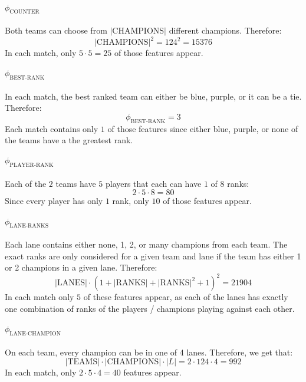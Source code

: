 \paragraph{$\phi_{\text{COUNTER}}$}
\begin{adjustwidth}{2cm}{}
Both teams can choose from $|\text{CHAMPIONS}|$ different champions. Therefore:
\[|\text{CHAMPIONS}|^2 = 124^2 = 15376\] 
In each match, only $5 \cdot 5 = 25$ of those features appear.
\end{adjustwidth}

\paragraph{$\phi_{\text{BEST-RANK}}$}
\begin{adjustwidth}{2cm}{}
In each match, the best ranked team can either be blue, purple, or it can be a tie. Therefore:
\[\phi_{\text{BEST-RANK}} = 3\] 
Each match contains only $1$ of those features since either blue, purple, or none of the teams have a the greatest rank.
\end{adjustwidth}

\paragraph{$\phi_{\text{PLAYER-RANK}}$}
\begin{adjustwidth}{2cm}{}
Each of the $2$ teams have $5$ players that each can have $1$ of $8$ ranks:
\[ 2 \cdot 5 \cdot 8 = 80\] 
Since every player has only $1$ rank, only $10$ of those features appear.
\end{adjustwidth}

\paragraph{$\phi_{\text{LANE-RANKS}}$}
\begin{adjustwidth}{2cm}{}
Each lane contains either none, 1, 2, or many champions from each team. The exact ranks are only considered for a given team and lane if the team has either 1 or 2 champions in a given lane. Therefore:
\[|\text{LANES}| \cdot (1 + |\text{RANKS}| + |\text{RANKS}|^2 + 1)^2 = 21904\]
In each match only $5$ of these features appear, as each of the lanes has exactly one combination of ranks of the players / champions playing against each other.
\end{adjustwidth}

\paragraph{$\phi_{\text{LANE-CHAMPION}}$}
\begin{adjustwidth}{2cm}{}
On each team, every champion can be in one of 4 lanes. Therefore, we get that:
\[|\text{TEAMS}| \cdot |\text{CHAMPIONS}| \cdot |L| = 2 \cdot 124 \cdot 4 = 992\]
In each match, only $2 \cdot 5 \cdot 4 = 40$ features appear.
\end{adjustwidth}

